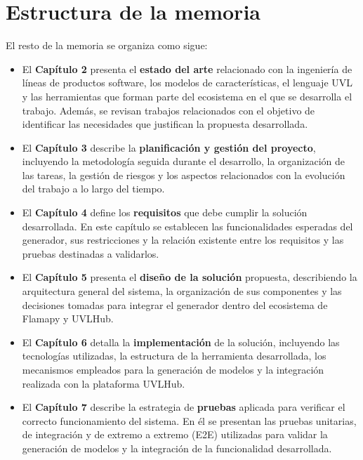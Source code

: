 \section{Estructura de la memoria}
\label{sec:estructura_memoria}

El resto de la memoria se organiza como sigue:

\begin{itemize}
    \item El \textbf{Capítulo 2} presenta el \textbf{estado del arte} relacionado con la ingeniería de líneas de productos software, los modelos de características, el lenguaje UVL y las herramientas que forman parte del ecosistema en el que se desarrolla el trabajo. Además, se revisan trabajos relacionados con el objetivo de identificar las necesidades que justifican la propuesta desarrollada.

    \item El \textbf{Capítulo 3} describe la \textbf{planificación y gestión del proyecto}, incluyendo la metodología seguida durante el desarrollo, la organización de las tareas, la gestión de riesgos y los aspectos relacionados con la evolución del trabajo a lo largo del tiempo.

    \item El \textbf{Capítulo 4} define los \textbf{requisitos} que debe cumplir la solución desarrollada. En este capítulo se establecen las funcionalidades esperadas del generador, sus restricciones y la relación existente entre los requisitos y las pruebas destinadas a validarlos.

    \item El \textbf{Capítulo 5} presenta el \textbf{diseño de la solución} propuesta, describiendo la arquitectura general del sistema, la organización de sus componentes y las decisiones tomadas para integrar el generador dentro del ecosistema de Flamapy y UVLHub.

    \item El \textbf{Capítulo 6} detalla la \textbf{implementación} de la solución, incluyendo las tecnologías utilizadas, la estructura de la herramienta desarrollada, los mecanismos empleados para la generación de modelos y la integración realizada con la plataforma UVLHub.

    \item El \textbf{Capítulo 7} describe la estrategia de \textbf{pruebas} aplicada para verificar el correcto funcionamiento del sistema. En él se presentan las pruebas unitarias, de integración y de extremo a extremo (E2E) utilizadas para validar la generación de modelos y la integración de la funcionalidad desarrollada.


\end{itemize}
